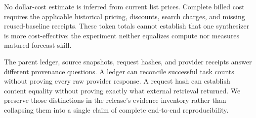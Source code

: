 \documentclass[11pt]{article}
\begin{document}
No dollar-cost estimate is inferred from current list prices. Complete billed cost requires the applicable historical pricing, discounts, search charges, and missing reused-baseline receipts. These token totals cannot establish that one synthesizer is more cost-effective: the experiment neither equalizes compute nor measures matured forecast skill.

The parent ledger, source snapshots, request hashes, and provider receipts answer different provenance questions. A ledger can reconcile successful task counts without proving every raw provider response. A request hash can establish content equality without proving exactly what external retrieval returned. We preserve those distinctions in the release's evidence inventory rather than collapsing them into a single claim of complete end-to-end reproducibility.
\end{document}
